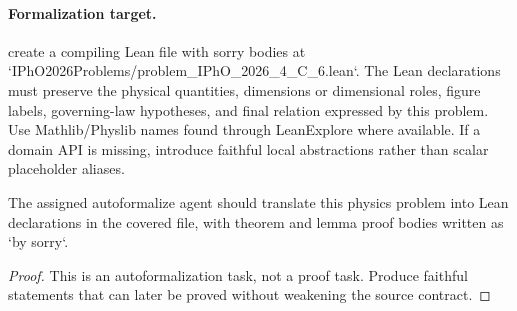 \paragraph{Formalization target.}
create a compiling Lean file with sorry bodies at `IPhO2026Problems/problem\_IPhO\_2026\_4\_C\_6.lean`.
The Lean declarations must preserve the physical quantities, dimensions or dimensional roles, figure labels, governing-law hypotheses, and final relation expressed by this problem.
Use Mathlib/Physlib names found through LeanExplore where available. If a domain API is missing, introduce faithful local abstractions rather than scalar placeholder aliases.

\begin{theorem}
\label{thm:physics:IPhO_2026_4_C_6:target}
The assigned autoformalize agent should translate this physics problem into Lean declarations in the covered file, with theorem and lemma proof bodies written as `by sorry`.
\end{theorem}
\begin{proof}
This is an autoformalization task, not a proof task. Produce faithful statements that can later be proved without weakening the source contract.
\end{proof}

